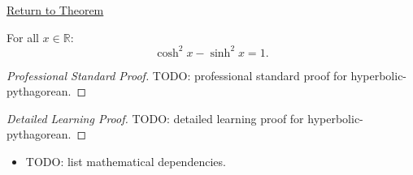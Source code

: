 \newpage
{}
\label{prf:hyperbolic-pythagorean}

\begin{remark*}[Return]
\hyperref[prop:hyperbolic-pythagorean]{Return to Theorem}
\end{remark*}

\begin{proposition*}
For all $x \in \mathbb{R}$:
\[
  \cosh^2 x - \sinh^2 x = 1.
\]

\smallskip\noindent
\end{proposition*}

\begin{proof}[Professional Standard Proof]
\LRAProofBodyStart
TODO: professional standard proof for hyperbolic-pythagorean.
\end{proof}

\begin{proof}[Detailed Learning Proof]
\LRAProofBodyStart
TODO: detailed learning proof for hyperbolic-pythagorean.
\end{proof}

\begin{remark*}
\end{remark*}

\begin{dependencies}
\begin{itemize}
  \item TODO: list mathematical dependencies.
\end{itemize}
\end{dependencies}

\clearpage
